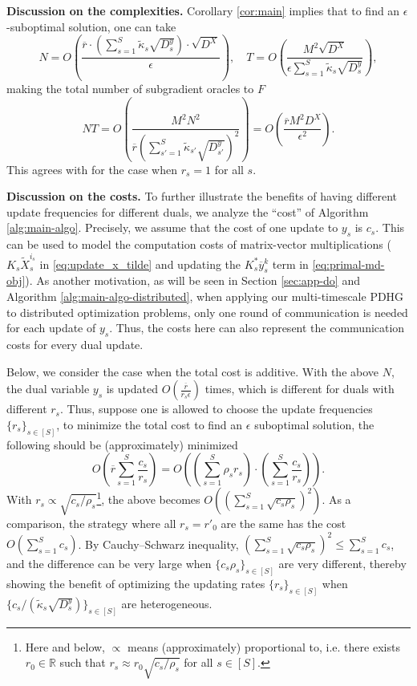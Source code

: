 \documentclass[10pt]{article}
\newcommand{\R}{\mathbb{R}}
\begin{document}
\textbf{Discussion on the complexities.} Corollary \ref{cor:main} implies that to find an $\epsilon$-suboptimal solution, one can take 
\begin{displaymath}
    N = O(\frac{\overline{r}\cdot (\sum_{s=1}^S \widetilde{\kappa}_{s}\sqrt{D_{s}^y})\cdot \sqrt{D^X}}{\epsilon}),\quad T = O(\frac{M^2\sqrt{D^X}}{\epsilon\sum_{s=1}^S \widetilde{\kappa}_{s}\sqrt{D_{s}^y}}),
\end{displaymath}
making the total number of subgradient oracles to $F$  
\begin{displaymath}
    NT = O(\frac{M^2N^2}{\overline{r}(\sum_{s'=1}^S \widetilde{\kappa}_{s'}\sqrt{D_{s'}^y})^2})=O(\frac{\overline{r}M^2D^X}{\epsilon^2}).
\end{displaymath}
This agrees with \cite{lan_communication-efficient_2020} for the case when $r_s = 1$ for all $s$.


\textbf{Discussion on the costs.} 
To further illustrate the benefits of having different update frequencies for different duals, we analyze the ``cost'' of Algorithm \ref{alg:main-algo}. Precisely, we assume that the cost of one update to $y_s$ is $c_s$. This can be used to model the computation costs of matrix-vector multiplications ($K_s\widetilde{X}_s^{i_s}$ in \eqref{eq:update_x_tilde} and updating the $K_s^*\overline{y}_s^k$ term in \eqref{eq:primal-md-obj}). As another motivation, as will be seen in Section \ref{sec:app-do} and Algorithm \ref{alg:main-algo-distributed}, when applying our multi-timescale PDHG to distributed optimization problems, only one round of communication is needed for each update of $y_s$. Thus, the costs here can also represent the communication costs for every dual update. 

Below, we consider the case when the total cost is additive. With the above $N$, the dual variable $y_s$ is updated $O(\frac{\overline{r}}{r_s\epsilon})$ times, which is different for duals with different $r_s$. Thus, suppose one is allowed to choose the update frequencies $\{r_s\}_{s\in [S]}$, to minimize the total cost to find an $\epsilon$ suboptimal solution, the following should be (approximately) minimized
\begin{displaymath}
    O(\overline{r}\sum_{s=1}^S \frac{c_s}{r_s}) = O((\sum_{s=1}^S\rho_sr_s)\cdot(\sum_{s=1}^S \frac{c_s}{r_s})).
\end{displaymath}
With $r_s \propto \sqrt{c_s/\rho_s}$\footnote{Here and below, $\propto$ means (approximately) proportional to, i.e. there exists $r_0\in \R$ such that $r_s \approx r_0\sqrt{c_s/\rho_s}$ for all $s\in [S]$.}, the above becomes $O((\sum_{s=1}^S \sqrt{c_s\rho_s})^2)$. As a comparison, the strategy where all $r_s=r'_0$ are the same has the cost $O(\sum_{s=1}^Sc_s)$. By Cauchy–Schwarz inequality, $(\sum_{s=1}^S \sqrt{c_s\rho_s})^2\leq \sum_{s=1}^Sc_s$, and the difference can be very large when $\{c_s\rho_s\}_{s\in [S]}$ are very different, thereby showing the benefit of optimizing the updating rates $\{r_s\}_{s\in [S]}$ when $\{c_s/(\widetilde{\kappa}_s\sqrt{D^y_s})\}_{s\in [S]}$ are heterogeneous. 
\end{document}
